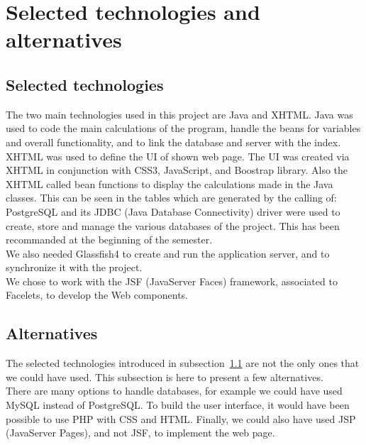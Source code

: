 \section{Selected technologies and alternatives}
\label{sec:techno}

\subsection{Selected technologies}
\label{ssec:select}

The two main technologies used in this project are Java and XHTML. Java was used to code the main calculations of the program, handle the beans for variables and overall functionality, and to link the database and server with the index. XHTML was used to define the UI of shown web page. The UI was created via XHTML in conjunction with CSS3, JavaScript, and Boostrap library. Also the XHTML called bean functions to display the calculations made in the Java classes. This can be seen in the tables which are generated by the calling of:\\

PostgreSQL and its JDBC (Java Database Connectivity) driver were used to create, store and manage the various databases of the project. This has been recommanded at the beginning of the semester.\\

We also needed Glassfish4 to create and run the application server, and to synchronize it with the project.\\

We chose to work with the JSF (JavaServer Faces)
framework, associated to Facelets, to develop the Web components.


\subsection{Alternatives}
\label{ssec:alter}

The selected technologies introduced in {\sc subsection}~\ref{ssec:select} are not the only ones that we could have used. This subsection is here to present a few alternatives.\\

There are many options to handle databases, for example we could have used MySQL instead of PostgreSQL. To build the user interface, it would have been possible to use PHP with CSS and HTML. Finally, we could also have used JSP (JavaServer Pages), and not JSF, to implement the web page.

